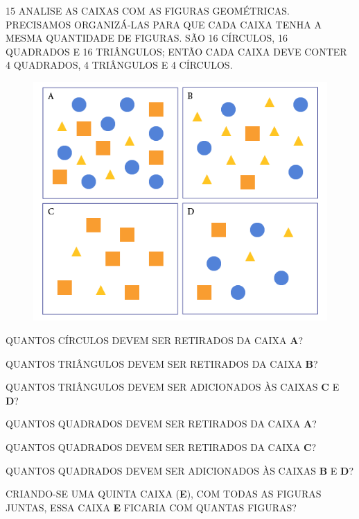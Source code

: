 \num{15} ANALISE AS CAIXAS COM AS FIGURAS GEOMÉTRICAS. PRECISAMOS ORGANIZÁ-LAS PARA QUE CADA CAIXA TENHA A MESMA QUANTIDADE DE FIGURAS. SÃO 16 CÍRCULOS, 16 QUADRADOS E 16 TRIÂNGULOS; ENTÃO CADA CAIXA DEVE CONTER 4 QUADRADOS, 4 TRIÂNGULOS E 4 CÍRCULOS.


\begin{figure}[htpb!]
\centering
\includegraphics[width=.5\textwidth]{../ilustracoes/MAT1/SAEB_1ANO_MAT_FIGURA31.png}
\end{figure}

\begin{escolha}
\item QUANTOS CÍRCULOS DEVEM SER RETIRADOS DA CAIXA \textbf{A}?


\item QUANTOS TRIÂNGULOS DEVEM SER RETIRADOS DA CAIXA \textbf{B}?


\item QUANTOS TRIÂNGULOS DEVEM SER ADICIONADOS ÀS CAIXAS \textbf{C} E \textbf{D}?


\item QUANTOS QUADRADOS DEVEM SER RETIRADOS DA CAIXA \textbf{A}?


\item QUANTOS QUADRADOS DEVEM SER RETIRADOS DA CAIXA \textbf{C}?


\item QUANTOS QUADRADOS DEVEM SER ADICIONADOS ÀS CAIXAS \textbf{B} E \textbf{D}?


\item CRIANDO-SE UMA QUINTA CAIXA (\textbf{E}), COM TODAS AS FIGURAS JUNTAS, ESSA CAIXA \textbf{E} FICARIA COM QUANTAS FIGURAS?

\end{escolha}

